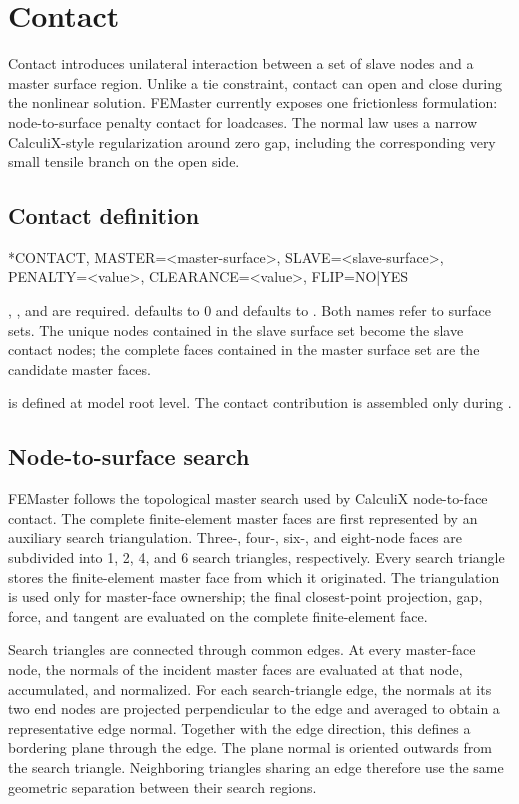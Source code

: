 \chapter{Contact}
\label{chap:contact}

Contact introduces unilateral interaction between a set of slave nodes and a master surface region. Unlike a tie constraint, contact can open and close during the nonlinear solution. FEMaster currently exposes one frictionless formulation: node-to-surface penalty contact for  loadcases. The normal law uses a narrow CalculiX-style regularization around zero gap, including the corresponding very small tensile branch on the open side.

\section{Contact definition}

\begin{syntax}
*CONTACT, MASTER=<master-surface>, SLAVE=<slave-surface>, PENALTY=<value>, CLEARANCE=<value>, FLIP=NO|YES
\end{syntax}

, , and  are required.  defaults to 0 and  defaults to . Both names refer to surface sets. The unique nodes contained in the slave surface set become the slave contact nodes; the complete faces contained in the master surface set are the candidate master faces.

 is defined at model root level. The contact contribution is assembled only during .

\section{Node-to-surface search}

FEMaster follows the topological master search used by CalculiX node-to-face contact. The complete finite-element master faces are first represented by an auxiliary search triangulation. Three-, four-, six-, and eight-node faces are subdivided into 1, 2, 4, and 6 search triangles, respectively. Every search triangle stores the finite-element master face from which it originated. The triangulation is used only for master-face ownership; the final closest-point projection, gap, force, and tangent are evaluated on the complete finite-element face.

Search triangles are connected through common edges. At every master-face node, the normals of the incident master faces are evaluated at that node, accumulated, and normalized. For each search-triangle edge, the normals at its two end nodes are projected perpendicular to the edge and averaged to obtain a representative edge normal. Together with the edge direction, this defines a bordering plane through the edge. The plane normal is oriented outwards from the search triangle. Neighboring triangles sharing an edge therefore use the same geometric separation between their search regions.

